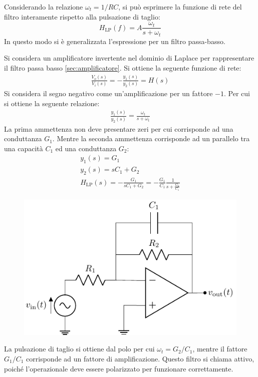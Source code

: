 \documentclass{article}
\numberwithin{equation}{subsection}
\begin{document}
Considerando la relazione $\omega_t=1/RC$, si può esprimere la funzione di rete del filtro interamente rispetto alla pulsazione di taglio:
\begin{equation}
    H_{\mathrm{LP}}(f)=A\displaystyle\frac{\omega_t}{s+\omega_t}
\end{equation}
In questo modo si è generalizzata l'espressione per un filtro passa-basso. 

Si considera un amplificatore invertente nel dominio di Laplace per rappresentare il filtro passa basso \ref{sec:amplificatore}. 
Si ottiene la seguente funzione di rete:
\begin{gather*}
    \displaystyle\frac{V_o(s)}{V_i(s)}=-\frac{y_1(s)}{y_2(s)}=H(s)
\end{gather*}
Si considera il segno negativo come un'amplificazione per un fattore $-1$. 
Per cui si ottiene la seguente relazione:
\begin{gather*}
    \displaystyle\frac{y_1(s)}{y_2(s)}=\frac{\omega_t}{s+\omega_t}
\end{gather*}
La prima ammettenza non deve presentare zeri per cui corrisponde ad una conduttanza $G_1$. Mentre la seconda ammettenza corrisponde ad un parallelo tra una capacità $C_1$ 
ed una conduttanza $G_2$:
\begin{gather*}
    y_1(s)=G_1\\
    y_2(s)=sC_1+G_2\\
    H_{\mathrm{LP}}(s)=-\displaystyle\frac{G_1}{sC_1+G_2}=-\frac{G_1}{C_1}\frac{1}{s+\displaystyle\frac{G_2}{C_1}}
\end{gather*}
\begin{figure}[H]%
    \centering
    \includegraphics{passa-basso-primo-ordine-attivo.pdf}%
\end{figure}
La pulsazione di taglio si ottiene dal polo per cui $\omega_t=G_2/C_1$, mentre il fattore $G_1/C_1$ corrisponde ad un fattore di amplificazione. 
Questo filtro si chiama attivo, poiché l'operazionale deve essere polarizzato per funzionare correttamente. 
\end{document}
